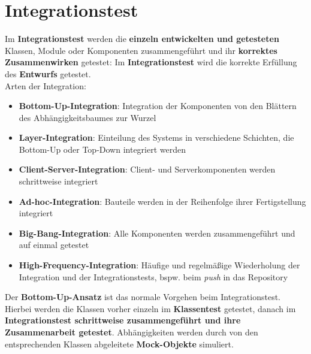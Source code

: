 \section{Integrationstest}

\begin{tcolorbox}[title=Integrationstest]
    Im \textbf{Integrationstest} werden die \textbf{einzeln entwickelten und getesteten} Klassen, Module oder Komponenten zusammengeführt und ihr \textbf{korrektes Zusammenwirken} getestet:
    Im \textbf{Integrationstest} wird die korrekte Erfüllung des \textbf{Entwurfs} getestet.\\

    \noindent
    Arten der Integration:
    \begin{itemize}
        \item \textbf{Bottom-Up-Integration}: Integration der Komponenten von den Blättern des Abhängigkeitsbaumes zur Wurzel
        \item \textbf{Layer-Integration}: Einteilung des Systems in verschiedene Schichten, die Bottom-Up oder Top-Down integriert werden
        \item \textbf{Client-Server-Integration}: Client- und Serverkomponenten werden schrittweise integriert
        \item \textbf{Ad-hoc-Integration}: Bauteile werden in der Reihenfolge ihrer Fertigstellung integriert
        \item \textbf{Big-Bang-Integration}: Alle Komponenten werden zusammengeführt und auf einmal getestet
        \item \textbf{High-Frequency-Integration}: Häufige und regelmäßige Wiederholung der Integration und der Integrationstests, bspw. beim \textit{push} in das Repository
    \end{itemize}

    \noindent
    Der \textbf{Bottom-Up-Ansatz} ist das normale Vorgehen beim Integrationstest.\\
    Hierbei werden die Klassen vorher einzeln im \textbf{Klassentest} getestet, danach im \textbf{Integrationstest schrittweise zusammengeführt und ihre Zusammenarbeit getestet}.
    Abhängigkeiten werden durch von den entsprechenden Klassen abgeleitete \textbf{Mock-Objekte} simuliert.
\end{tcolorbox}


